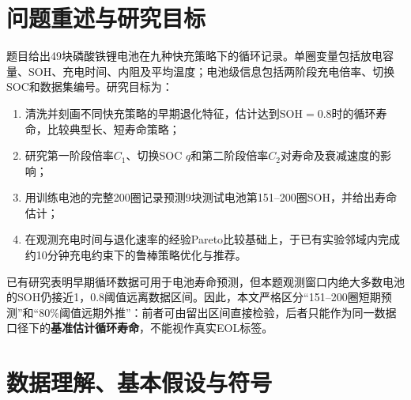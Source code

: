 \documentclass[withoutpreface]{cumcmthesis}
\newcommand{\SOH}{\mathrm{SOH}}
\begin{document}
\begin{abstract}
最后，以49块电池前150圈的观测充电时间和稳定退化速率比较九种真实策略，得到三点经验Pareto前沿。连续优化仅限于数据集3六种新结构策略的原始参数凸包与$(A,D)$特征凸包交集，并施加标准化近邻距离和$T_{0\rightarrow80}\le10.0132$ min约束。在倍率0.1C、SOC 1\%的597个可行网格中，以策略内Bootstrap退化预测的90\%分位数为目标；独立5000次验证Bootstrap表明局部候选5.1C--45\%--4.5C优于最佳已有策略的概率仅47.1\%，配对差90\%分位数为$3.24\times10^{-6}>0$，故不强行推荐新参数。最终推荐已有实验策略5.3C--54\%--4.0C新结构；其在40块完整电池第151--200圈真实退化速率的策略级排序中位列第2，与问题三短期结果没有明显矛盾。该推荐限于当前电芯、实验类别和约10分钟充至80\%的局部设计域。

\end{abstract}

\section{问题重述与研究目标}

题目给出49块磷酸铁锂电池在九种快充策略下的循环记录。单圈变量包括放电容量、SOH、充电时间、内阻及平均温度；电池级信息包括两阶段充电倍率、切换SOC和数据集编号。研究目标为：

\begin{enumerate}[label=\arabic*)]
  \item 清洗并刻画不同快充策略的早期退化特征，估计达到$\SOH=0.8$时的循环寿命，比较典型长、短寿命策略；
  \item 研究第一阶段倍率$C_1$、切换SOC $q$和第二阶段倍率$C_2$对寿命及衰减速度的影响；
  \item 用训练电池的完整200圈记录预测9块测试电池第151--200圈SOH，并给出寿命估计；
  \item 在观测充电时间与退化速率的经验Pareto比较基础上，于已有实验邻域内完成约10分钟充电约束下的鲁棒策略优化与推荐。
\end{enumerate}

已有研究表明早期循环数据可用于电池寿命预测\cite{severson2019}，但本题观测窗口内绝大多数电池的SOH仍接近1，$0.8$阈值远离数据区间。因此，本文严格区分“151--200圈短期预测”和“80\%阈值远期外推”：前者可由留出区间直接检验，后者只能作为同一数据口径下的\textbf{基准估计循环寿命}，不能视作真实EOL标签。

\section{数据理解、基本假设与符号}
\end{document}
